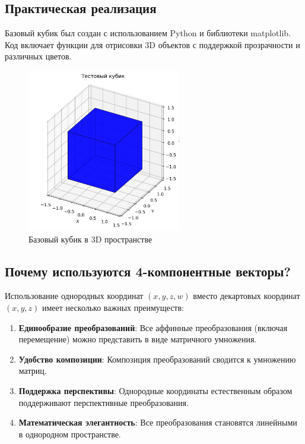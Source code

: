 \subsection*{Практическая реализация}

Базовый кубик был создан с использованием Python и библиотеки matplotlib. Код включает функции для отрисовки 3D объектов с поддержкой прозрачности и различных цветов.

\begin{figure}[h]
\centering
\includegraphics[width=0.6\textwidth]{images/task1/test_cube.png}
\caption{Базовый кубик в 3D пространстве}
\label{fig:basic_cube}
\end{figure}

\subsection*{Почему используются 4-компонентные векторы?}

Использование однородных координат $(x, y, z, w)$ вместо декартовых координат $(x, y, z)$ имеет несколько важных преимуществ:

\begin{enumerate}
\item \textbf{Единообразие преобразований}: Все аффинные преобразования (включая перемещение) можно представить в виде матричного умножения.

\item \textbf{Удобство композиции}: Композиция преобразований сводится к умножению матриц.

\item \textbf{Поддержка перспективы}: Однородные координаты естественным образом поддерживают перспективные преобразования.

\item \textbf{Математическая элегантность}: Все преобразования становятся линейными в однородном пространстве.
\end{enumerate}


